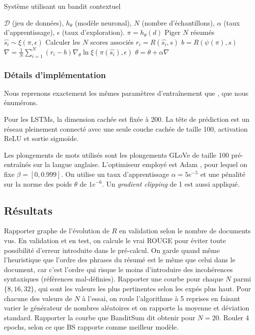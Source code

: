 \begin{algorithm}
    \caption{Système utilisant un bandit contextuel}
    \begin{algorithmic}[1]
        \Require  $\mathcal{D}$ (jeu de données), $h_\theta$ (modèle neuronal), $N$ (nombre d'échantillons), $\alpha$ (taux d'apprentissage), $\epsilon$ (taux d'exploration).
         
        \State $\pi = h_\theta(d)$
        \State Piger $N$ résumés $\hat{s_i} \sim \xi(\pi, \epsilon)$
        \State Calculer les $N$ scores associés $r_i = R(\hat{s_i}, s)$
        \State $b = R(\psi(\pi), s)$
        \State $\nabla = \frac{1}{N} \sum_{i=1}^N (r_i - b) \nabla_\theta \ln \xi \left(\pi(\hat{s_i}), \epsilon \right)$ 
        \State $\theta = \theta + \alpha \nabla$
        \EndWhile
    \end{algorithmic}
    \label{alg:Banditsum}
\end{algorithm}

\subsubsection*{Détails d'implémentation}

Nous reprenons exactement les mêmes paramètres d'entraînement que \citep{dong2018banditsum},
que nous énumérons.

Pour les LSTMs, la dimension cachée est fixée à 200.
La tête de prédiction est un réseau pleinement connecté avec une seule couche cachée
de taille 100, activation ReLU \citep{agarap2018learning} et sortie sigmoïde.

Les plongements de mots utilisés sont les plongements GLoVe \citep{pennington2014glove} de taille 100 
pré-entraînés sur la langue anglaise.
L'optimiseur employé est Adam \citep{kingma2014method}, pour lequel on fixe 
$\beta = [0, 0.999]$.
On utilise un taux d'apprentissage $\alpha=5e^{-5}$ et une pénalité sur la norme 
des poids $\theta$ de $1e^{-6}$.
Un \textit{gradient clipping} de 1 est aussi appliqué.

\subsection{Résultats}


Rapporter graphe de l'évolution de $R$ en validation selon le nombre de documents vus.
En validation et en test, on calcule le vrai ROUGE pour éviter toute possibilité 
d'erreur introduite dans le pré-calcul.
On garde quand même l'heuristique que l'ordre des phrases du résumé est le même que celui 
dans le document, car c'est l'ordre qui risque le moins d'introduire des incohérences
syntaxiques (références mal-définies).
Rapporter une courbe pour chaque $N$ parmi $\{8,16,32\}$, qui sont les valeurs les plus
pertinentes selon les expés plus haut.
Pour chacune des valeurs de $N$ à l'essai, on roule l'algorithme à 5 reprises 
en faisant varier le générateur de nombres aléatoires et on rapporte la 
moyenne et déviation standard.
Rapporter la courbe que BanditSum dit obtenir pour $N=20$.
Rouler 4 epochs, selon ce que BS rapporte comme meilleur modèle.

